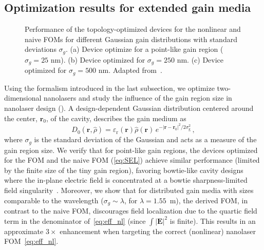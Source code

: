\subsection*{Optimization results for extended gain media}

\begin{figure}[tb]
    \centering
    \caption{Performance of the topology-optimized devices for the nonlinear and naive FOMs for different Gaussian gain distributions with standard deviations $\sigma_g$. (a) Device optimize for a point-like gain region ($\sigma_g=25$ nm).
    (b) Device optimized for $\sigma_g=250$ nm. (c) Device optimized for $\sigma_g=500$ nm. Adapted from~\cite{ownpub4}.}
    \label{fig:laser_size}
\end{figure}

Using the formalism introduced in the last subsection, we optimize two-dimensional nanolasers and study the influence of the gain region size in 
nanolaser design (). A design-dependent Gaussian distribution centered around the center, $\mathbf{r}_0$, of the cavity, describes the gain medium as
\begin{equation}
D_0 (\mathbf{r}, \hat{\rho}) = \varepsilon_{\text{r}}(\mathbf{r})  \hat{\rho}(\mathbf{r}) \, e^{- \vert \mathbf{r}- \mathbf{r}_0 \vert^2 / 2 \sigma_{\text{g}}^2 }\,,
\end{equation}
where
$\sigma_g$ is the standard deviation of the Gaussian and acts as a measure of the gain region size. We verify that for point-like gain regions, the devices optimized for the FOM and the naive FOM (\eqref{eq:SEL})
achieve similar performance (limited by the finite size of the tiny gain region), favoring bowtie-like cavity designs
where the in-plane electric field is concentrated at a bowtie sharpness-limited field singularity~\cite{sing}. Moreover, we show that for distributed gain media with sizes comparable to the wavelength 
($\sigma_g \sim \lambda$, for $\lambda = 1.55$~\textmu m), 
the derived FOM, in contrast to the naive FOM, discourages field localization due to the quartic field term in the denominator of~\eqref{eq:eff_nl} 
(since $\int |\mathbf{E}|^2$ is finite). 
This results in an approximate $3\times$ enhancement when targeting the correct (nonlinear) nanolaser FOM~\eqref{eq:eff_nl}.

